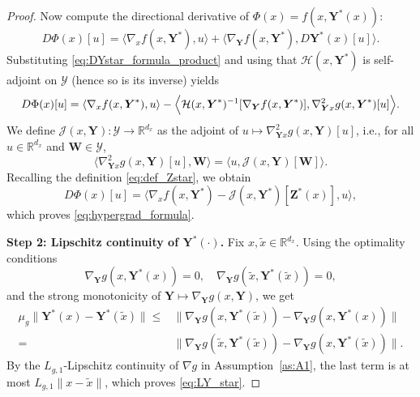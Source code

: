 \documentclass{pkumelon}
\theoremstyle{plain}
\newcommand{\R}{\mathbb{R}}
\newcommand{\Phiobj}{\Phi}
\begin{document}
\begin{proof}
Now compute the directional derivative of $\Phiobj(x)=f(x,\boldsymbol Y^*(x))$:
\begin{equation*}
D\Phiobj(x)[u] =\langle \nabla_x f(x,\boldsymbol Y^*),u\rangle +\langle \nabla_{\boldsymbol Y}f(x,\boldsymbol Y^*),D\boldsymbol Y^*(x)[u]\rangle.
\end{equation*}
Substituting \eqref{eq:DYstar_formula_product} and using that $\mathcal H(x,\boldsymbol Y^*)$ is self-adjoint on $\mathcal Y$ (hence so is its inverse) yields
\begin{equation*}
D\Phiobj(x)[u]
={}\langle \nabla_x f(x,\boldsymbol Y^*),u\rangle -\Bigl\langle
\mathcal H(x,\boldsymbol Y^*)^{-1}[\nabla_{\boldsymbol Y}f(x,\boldsymbol Y^*)],
\nabla_{\boldsymbol Y x}^2 g(x,\boldsymbol Y^*)[u]
\Bigr\rangle.
\end{equation*}
We define $\mathcal J(x,\boldsymbol Y):\mathcal Y\to\R^{d_x}$ as the adjoint of $u\mapsto \nabla_{\boldsymbol Y x}^2 g(x,\boldsymbol Y)[u]$, i.e., for all $u\in\R^{d_x}$ and $\boldsymbol W\in\mathcal Y$,
\begin{equation}\label{eq:adjoint_J_product}
\langle \nabla_{\boldsymbol Y x}^2 g(x,\boldsymbol Y)[u],\boldsymbol W\rangle
=\langle u,\mathcal J(x,\boldsymbol Y)[\boldsymbol W]\rangle.
\end{equation}
Recalling the definition \eqref{eq:def_Zstar}, we obtain
\begin{equation*}
D\Phiobj(x)[u] =\langle \nabla_x f(x,\boldsymbol Y^*)-\mathcal J(x,\boldsymbol Y^*)[\boldsymbol Z^*(x)],u\rangle,
\end{equation*}
which proves \eqref{eq:hypergrad_formula}.

\textbf{Step 2: Lipschitz continuity of $\boldsymbol Y^*(\cdot)$. }
Fix $x,\tilde x\in\R^{d_x}$. Using the optimality conditions
\begin{equation*}
\nabla_{\boldsymbol Y}g(x,\boldsymbol Y^*(x))=0, \quad \nabla_{\boldsymbol Y}g(\tilde x,\boldsymbol Y^*(\tilde x))=0,
\end{equation*}
and the strong monotonicity of $\boldsymbol Y\mapsto \nabla_{\boldsymbol Y}g(x,\boldsymbol Y)$, we get
\begin{equation*}
\begin{aligned}
\mu_g\|\boldsymbol Y^*(x)-\boldsymbol Y^*(\tilde x)\|
\le{}& \|\nabla_{\boldsymbol Y}g(x,\boldsymbol Y^*(\tilde x))-\nabla_{\boldsymbol Y}g(x,\boldsymbol Y^*(x))\| \\
={}& \|\nabla_{\boldsymbol Y}g(\tilde x,\boldsymbol Y^*(\tilde x))-\nabla_{\boldsymbol Y}g(x,\boldsymbol Y^*(\tilde x))\|.
\end{aligned}
\end{equation*}
By the $L_{g,1}$-Lipschitz continuity of $\nabla g$ in Assumption~\ref{as:A1}, the last term is at most $L_{g,1}\|x-\tilde x\|$, which proves \eqref{eq:LY_star}.


\end{proof}
\end{document}
